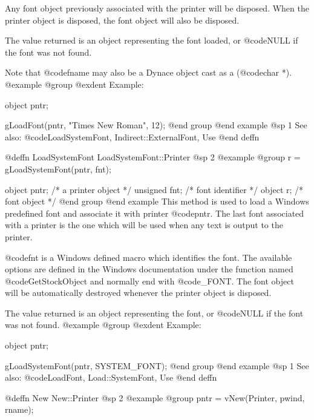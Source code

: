 Any font object previously associated with the printer will be
disposed.  When the printer object is disposed, the font object
will also be disposed.

The value returned is an object representing the font loaded, or
@code{NULL} if the font was not found.

Note that @code{fname} may also be a Dynace object cast as a (@code{char *}).
@example
@group
@exdent Example:

object  pntr;

gLoadFont(pntr, "Times New Roman", 12);
@end group
@end example
@sp 1
See also:  @code{LoadSystemFont, Indirect::ExternalFont, Use}
@end deffn














@deffn {LoadSystemFont} LoadSystemFont::Printer
@sp 2
@example
@group
r = gLoadSystemFont(pntr, fnt);

object   pntr;  /*  a printer object  */
unsigned fnt;   /*  font identifier  */
object   r;     /*  font object      */
@end group
@end example
This method is used to load a Windows predefined font and associate it
with printer @code{pntr}.  The last font associated with a printer is the
one which will be used when any text is output to the printer.

@code{fnt} is a Windows defined macro which identifies the font.  The
available options are defined in the Windows documentation under the
function named @code{GetStockObject} and normally end with @code{_FONT}.
The font object will be automatically destroyed whenever the printer
object is disposed.

The value returned is an object representing the font, or
@code{NULL} if the font was not found.
@example
@group
@exdent Example:

object  pntr;

gLoadSystemFont(pntr, SYSTEM_FONT);
@end group
@end example
@sp 1
See also:  @code{LoadFont, Load::SystemFont, Use}
@end deffn

















@deffn {New} New::Printer
@sp 2
@example
@group
pntr = vNew(Printer, pwind, rname); 

